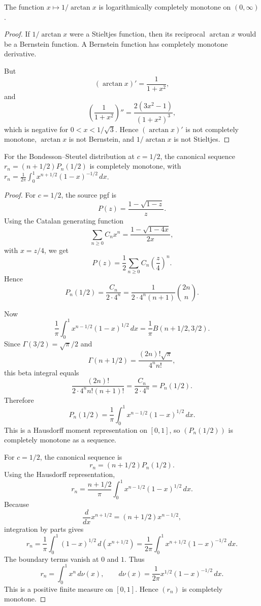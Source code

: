 \begin{lemma}
\label{res:reciprocal-arctan-lcm}
The function \(x\mapsto1/\arctan x\) is logarithmically completely monotone on \((0,\infty)\).
\end{lemma}
\begin{proof}
If \(1/\arctan x\) were a Stieltjes function, then its reciprocal \(\arctan x\) would be a Bernstein function. A Bernstein function has completely monotone derivative.

But
\[
(\arctan x)'=\frac1{1+x^2},
\]
and
\[
\left(\frac1{1+x^2}\right)''
=\frac{2(3x^2-1)}{(1+x^2)^3},
\]
which is negative for \(0<x<1/\sqrt3\). Hence \((\arctan x)'\) is not completely monotone, \(\arctan x\) is not Bernstein, and \(1/\arctan x\) is not Stieltjes.
\end{proof}

\begin{lemma}[Bondesson Steutel c=1/2 canonical r sequence completely monotone]
\label{res:bs-c-half-canonical-r-sequence-cm}
For the Bondesson--Steutel distribution at \(c=1/2\), the canonical sequence \(r_n=(n+1/2)P_n(1/2)\) is completely monotone, with \(r_n=\frac{1}{2\pi}\int_0^1 x^{n+1/2}(1-x)^{-1/2}\,dx\).
\end{lemma}
\begin{proof}
For \(c=1/2\), the source pgf is
\[
P(z)=\frac{1-\sqrt{1-z}}{z}.
\]
Using the Catalan generating function
\[
\sum_{n\ge0}C_n x^n=\frac{1-\sqrt{1-4x}}{2x},
\]
with \(x=z/4\), we get
\[
P(z)=\frac12\sum_{n\ge0}C_n\left(\frac z4\right)^n.
\]
Hence
\[
P_n(1/2)=\frac{C_n}{2\cdot4^n}
=\frac{1}{2\cdot4^n(n+1)}\binom{2n}{n}.
\]

Now
\[
\frac1\pi\int_0^1 x^{n-1/2}(1-x)^{1/2}\,dx
=\frac1\pi B(n+1/2,3/2).
\]
Since \(\Gamma(3/2)=\sqrt\pi/2\) and
\[
\Gamma(n+1/2)=\frac{(2n)!\sqrt\pi}{4^n n!},
\]
this beta integral equals
\[
\frac{(2n)!}{2\cdot4^n n!(n+1)!}
=\frac{C_n}{2\cdot4^n}
=P_n(1/2).
\]
Therefore
\[
P_n(1/2)=\frac1\pi\int_0^1 x^{n-1/2}(1-x)^{1/2}\,dx.
\]
This is a Hausdorff moment representation on \([0,1]\), so \((P_n(1/2))\) is completely monotone as a sequence.

For \(c=1/2\), the canonical sequence is
\[
r_n=(n+1/2)P_n(1/2).
\]
Using the Hausdorff representation,
\[
r_n=\frac{n+1/2}{\pi}\int_0^1 x^{n-1/2}(1-x)^{1/2}\,dx.
\]
Because
\[
\frac{d}{dx}x^{n+1/2}=(n+1/2)x^{n-1/2},
\]
integration by parts gives
\[
r_n
=\frac1\pi\int_0^1 (1-x)^{1/2}\,d(x^{n+1/2})
=\frac{1}{2\pi}\int_0^1 x^{n+1/2}(1-x)^{-1/2}\,dx.
\]
The boundary terms vanish at \(0\) and \(1\). Thus
\[
r_n=\int_0^1 x^n\,d\nu(x),
\qquad
d\nu(x)=\frac{1}{2\pi}x^{1/2}(1-x)^{-1/2}\,dx.
\]
This is a positive finite measure on \([0,1]\). Hence \((r_n)\) is completely monotone.
\end{proof}

